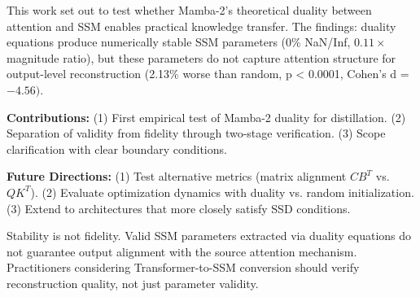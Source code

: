 
This work set out to test whether Mamba-2's theoretical duality between attention and SSM enables practical knowledge transfer. The findings: duality equations produce numerically stable SSM parameters (0\% NaN/Inf, 0.$11\times$ magnitude ratio), but these parameters do not capture attention structure for output-level reconstruction (2.13\% worse than random, p < 0.0001, Cohen's d = $-4.56)$.

\textbf{Contributions:} (1) First empirical test of Mamba-2 duality for distillation. (2) Separation of validity from fidelity through two-stage verification. (3) Scope clarification with clear boundary conditions.

\textbf{Future Directions:} (1) Test alternative metrics (matrix alignment $CB^T$ vs.\ $QK^T$). (2) Evaluate optimization dynamics with duality vs. random initialization. (3) Extend to architectures that more closely satisfy SSD conditions.

Stability is not fidelity. Valid SSM parameters extracted via duality equations do not guarantee output alignment with the source attention mechanism. Practitioners considering Transformer-to-SSM conversion should verify reconstruction quality, not just parameter validity.
